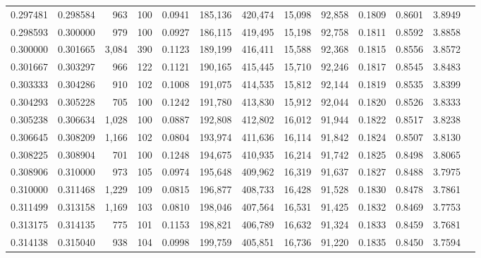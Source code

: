 \begin{tabular}{rrrrrrrrrrrrr}
0.297481 & 0.298584 &    963 &   100 &                                     0.0941 & 185,136 & 420,474 &  15,098 &  92,858 & 0.1809 & 0.8601 & 3.8949 \\
0.298593 & 0.300000 &    979 &   100 &                                     0.0927 & 186,115 & 419,495 &  15,198 &  92,758 & 0.1811 & 0.8592 & 3.8858 \\
0.300000 & 0.301665 &  3,084 &   390 &                                     0.1123 & 189,199 & 416,411 &  15,588 &  92,368 & 0.1815 & 0.8556 & 3.8572 \\
0.301667 & 0.303297 &    966 &   122 &                                     0.1121 & 190,165 & 415,445 &  15,710 &  92,246 & 0.1817 & 0.8545 & 3.8483 \\
0.303333 & 0.304286 &    910 &   102 &                                     0.1008 & 191,075 & 414,535 &  15,812 &  92,144 & 0.1819 & 0.8535 & 3.8399 \\
0.304293 & 0.305228 &    705 &   100 &                                     0.1242 & 191,780 & 413,830 &  15,912 &  92,044 & 0.1820 & 0.8526 & 3.8333 \\
0.305238 & 0.306634 &  1,028 &   100 &                                     0.0887 & 192,808 & 412,802 &  16,012 &  91,944 & 0.1822 & 0.8517 & 3.8238 \\
0.306645 & 0.308209 &  1,166 &   102 &                                     0.0804 & 193,974 & 411,636 &  16,114 &  91,842 & 0.1824 & 0.8507 & 3.8130 \\
0.308225 & 0.308904 &    701 &   100 &                                     0.1248 & 194,675 & 410,935 &  16,214 &  91,742 & 0.1825 & 0.8498 & 3.8065 \\
0.308906 & 0.310000 &    973 &   105 &                                     0.0974 & 195,648 & 409,962 &  16,319 &  91,637 & 0.1827 & 0.8488 & 3.7975 \\
0.310000 & 0.311468 &  1,229 &   109 &                                     0.0815 & 196,877 & 408,733 &  16,428 &  91,528 & 0.1830 & 0.8478 & 3.7861 \\
0.311499 & 0.313158 &  1,169 &   103 &                                     0.0810 & 198,046 & 407,564 &  16,531 &  91,425 & 0.1832 & 0.8469 & 3.7753 \\
0.313175 & 0.314135 &    775 &   101 &                                     0.1153 & 198,821 & 406,789 &  16,632 &  91,324 & 0.1833 & 0.8459 & 3.7681 \\
0.314138 & 0.315040 &    938 &   104 &                                     0.0998 & 199,759 & 405,851 &  16,736 &  91,220 & 0.1835 & 0.8450 & 3.7594 \\

\end{tabular}

